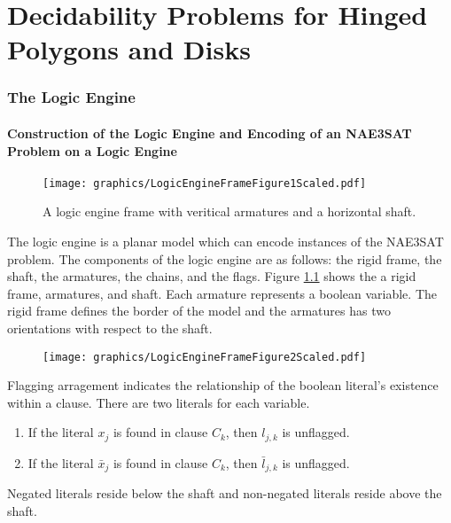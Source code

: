 \chapter{Decidability Problems for Hinged Polygons and Disks}
\subsection{The Logic Engine}
\subsubsection{Construction of the Logic Engine and Encoding of an NAE3SAT Problem on a Logic 
Engine}
\begin{figure}[!h]
\begin{center}
\texttt{[image: graphics/LogicEngineFrameFigure1Scaled.pdf]}
\caption{A logic engine frame with veritical armatures and a horizontal 
shaft.}\label{fig:LogicEngineFrameFigure1.pdf}
\end{center}
\end{figure}
The logic engine is a planar model which can encode instances of the NAE3SAT problem.  The 
components of the logic engine are as follows: the rigid frame, the shaft, the armatures,
the chains, and the flags.  Figure \ref{fig:LogicEngineFrameFigure1.pdf} shows the a rigid frame, 
armatures, and shaft.  Each armature represents a boolean variable.  The rigid frame defines the border 
of the model and the armatures has two orientations with respect to the shaft.  
\begin{figure}[!h]
\begin{center}
\texttt{[image: graphics/LogicEngineFrameFigure2Scaled.pdf]}
\caption{}\label{fig:LogicEngineFrameFigure2.pdf}
\end{center}
\end{figure}
Flagging arragement indicates the relationship of the boolean literal's existence within a clause.  
There are two literals for each variable.  
\begin{enumerate}
 \item If the literal $x_j$ is found in clause $C_k$, then $l_{j,k}$ is unflagged.
 \item If the literal $\bar{x}_j$ is found in clause $C_k$, then $\bar{l}_{j,k}$ is unflagged.
\end{enumerate}
Negated literals reside below the shaft and non-negated literals reside above the shaft.

